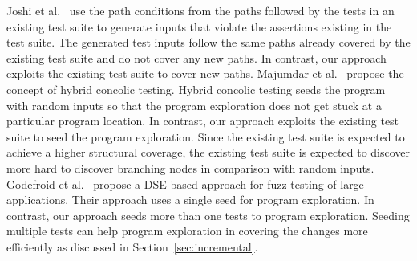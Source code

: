 Joshi et al.~\cite{joshi:pretext} use the path conditions from the paths followed by the tests in an existing test suite to generate inputs that violate the assertions existing in the test suite. The generated test inputs follow the same paths already covered by the existing test suite and do not cover any new paths. In contrast, our approach exploits the existing test suite to cover new paths. Majumdar et al.~\cite{majumdar:hybrid} propose the concept of hybrid concolic testing. Hybrid concolic testing seeds the program with random inputs so that the program exploration does not get stuck at a particular program location. In contrast, our approach exploits the existing test suite to seed the program exploration. Since the existing test suite is expected to achieve a higher structural coverage, the existing test suite is expected to discover more hard to discover branching nodes in comparison with random inputs. Godefroid et al.~\cite{godefroid:fuzz} propose a DSE based approach for fuzz testing of large applications. Their approach uses a single seed for program exploration. In contrast, our approach  seeds more than one tests to program exploration. Seeding multiple tests can help program exploration in covering the changes more efficiently as discussed in Section~\ref{sec:incremental}. 